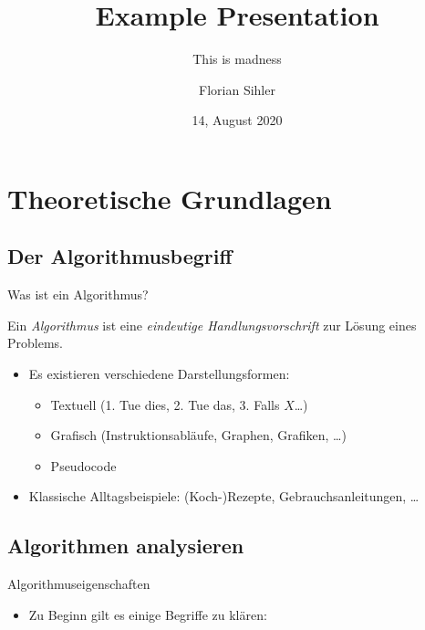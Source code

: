\documentclass[aspectratio=169,usepdftitle=true]{beamer}
\title{Example Presentation}
\subtitle{This is madness}
\institute{Cute-Dispute-Institute \(\circ\) University Ulm}
\date{14, August 2020}
\author{Florian Sihler}
\begin{document}
\section{Theoretische Grundlagen}
\subsection{Der Algorithmusbegriff}
\begin{frame}{Was ist ein Algorithmus?}
    \begin{definition}[Algorithmus]
        Ein \emph{Algorithmus} ist eine \emph{eindeutige Handlungsvorschrift} zur Lösung eines Problems.
    \end{definition}
    \begin{itemize}
        \item Es existieren verschiedene Darstellungsformen: \begin{itemize}
            \item Textuell (1. Tue dies, 2. Tue das, 3. Falls \(X\)\ldots)
            \item Grafisch (Instruktionsabläufe, Graphen, Grafiken, \ldots)
            \item Pseudocode
        \end{itemize}
        \item Klassische Alltagsbeispiele: (Koch-)Rezepte, Gebrauchsanleitungen, \ldots
    \end{itemize}
\end{frame}

\subsection{Algorithmen analysieren}
\begin{frame}{Algorithmuseigenschaften}
    \begin{itemize}
        \item Zu Beginn gilt es einige Begriffe zu klären: 
    \end{itemize}
\end{frame}
\end{document}
